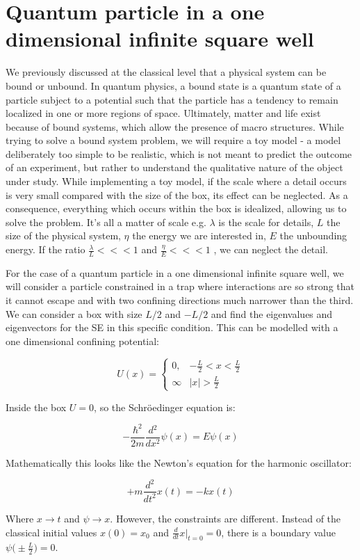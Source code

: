 \section{Quantum particle in a one dimensional infinite square well}
We previously discussed at the classical level that a physical system can be bound or unbound. In quantum physics, a bound state is a quantum state of a particle subject to a potential such that the particle has a tendency to remain localized in one or more regions of space. Ultimately, matter and life exist because of bound systems, which allow the presence of macro structures.  
While trying to solve a bound system problem, we will require a toy model - a model deliberately too simple to be realistic, which is not meant to predict the outcome of an experiment, but rather to understand the qualitative nature of the object under study.
While implementing a toy model, if the scale where a detail occurs is very small compared with the size of the box, its effect can be neglected. As a consequence, everything which occurs within the box is idealized, allowing us to solve the problem. It's all a matter of scale e.g. $\lambda$ is the scale for details, $L$ the size of the physical system, $\eta$ the energy we are interested in, $E$ the unbounding energy. If the ratio $\frac{\lambda}{L}<<<1$ and $\frac{\eta}{E}<<<1$ , we can neglect the detail.

For the case of a quantum particle in a one dimensional infinite square well, we will consider a particle constrained in a trap where interactions are so strong that it cannot escape and with two confining directions much narrower than the third. We can consider a box with size $L/2$ and $-L/2$ and find the eigenvalues and eigenvectors for the SE in this specific condition. 
This can be modelled with a one dimensional confining potential:

$$U(x) = \begin{cases} 0, &-\frac{L}{2}<x<\frac{L}{2}\\\infty &|x|>\frac{L}{2}\end{cases}$$

Inside the box $U=0$, so the Schr\"oedinger equation is:

$$-\frac{\hbar^2}{2m}\frac{d{^2}}{d{x^2}}\psi(x) = E\psi(x)$$

Mathematically this looks like the Newton's equation for the harmonic oscillator:

$$+m \frac{d{^2}}{d{t^2}}x(t) = -kx(t)$$

Where $x\rightarrow t$ and $\psi\rightarrow x$.
However, the constraints are different. Instead of the classical initial values $x(0) = x_0$ and $\frac{d{}}{d{t}}x|_{t=0} = 0$, there is a boundary value $\psi\biggl(\pm \frac{L}{2}\biggr) = 0$.

